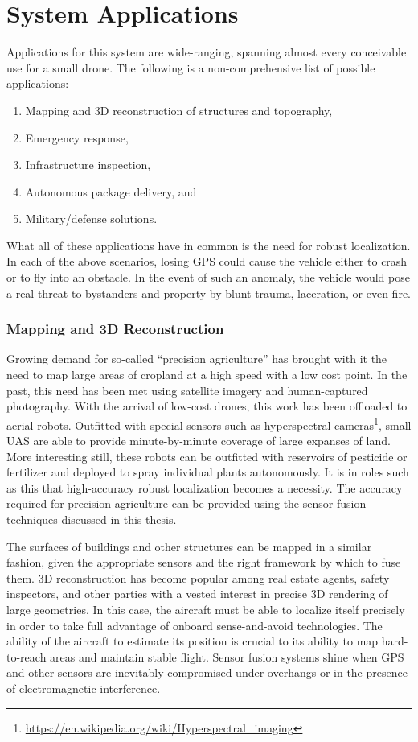 \section{System Applications}

Applications for this system are wide-ranging, spanning almost every conceivable use for a small drone. The following is a non-comprehensive list of possible applications:
\begin{enumerate}
    \item Mapping and 3D reconstruction of structures and topography,
    \item Emergency response,
    \item Infrastructure inspection,
    \item Autonomous package delivery, and
    \item Military/defense solutions.
\end{enumerate}
What all of these applications have in common is the need for robust localization. In each of the above scenarios, losing GPS could cause the vehicle either to crash or to fly into an obstacle. In the event of such an anomaly, the vehicle would pose a real threat to bystanders and property by blunt trauma, laceration, or even fire.

\subsubsection{Mapping and 3D Reconstruction}

Growing demand for so-called ``precision agriculture'' has brought with it the need to map large areas of cropland at a high speed with a low cost point. In the past, this need has been met using satellite imagery and human-captured photography. With the arrival of low-cost drones, this work has been offloaded to aerial robots. Outfitted with special sensors such as hyperspectral cameras\footnote{\url{https://en.wikipedia.org/wiki/Hyperspectral_imaging}}, small UAS are able to provide minute-by-minute coverage of large expanses of land. More interesting still, these robots can be outfitted with reservoirs of pesticide or fertilizer and deployed to spray individual plants autonomously. It is in roles such as this that high-accuracy robust localization becomes a necessity. The accuracy required for precision agriculture can be provided using the sensor fusion techniques discussed in this thesis.

The surfaces of buildings and other structures can be mapped in a similar fashion, given the appropriate sensors and the right framework by which to fuse them. 3D reconstruction has become popular among real estate agents, safety inspectors, and other parties with a vested interest in precise 3D rendering of large geometries. In this case, the aircraft must be able to localize itself precisely in order to take full advantage of onboard sense-and-avoid technologies. The ability of the aircraft to estimate its position is crucial to its ability to map hard-to-reach areas and maintain stable flight. Sensor fusion systems shine when GPS and other sensors are inevitably compromised under overhangs or in the presence of electromagnetic interference.

